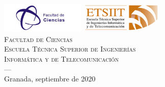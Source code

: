 \begin{titlepage}
\begin{minipage}{\textwidth}
	\includegraphics[width=0.3\textwidth]{images/logo_ciencias.png}
	\hspace{1.5cm}
	\includegraphics[width=0.3\textwidth]{images/logo_etsiit.png}\\[0.1cm]
	\textsc{Facultad de Ciencias\\Escuela Técnica Superior de Ingenierías\\Informática y de Telecomunicación}\\
	\textsc{---}\\
	Granada, septiembre de 2020
\end{minipage}
\end{titlepage}


